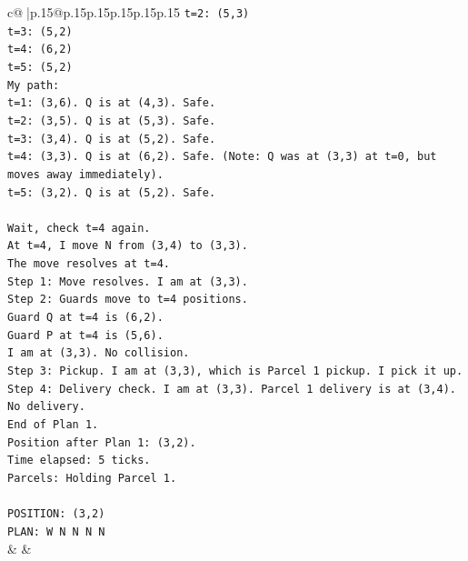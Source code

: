 \documentclass{article}
\begin{document}
{\begin{supertabular}{c@{$\;$}|p{.15\linewidth}@{}p{.15\linewidth}p{.15\linewidth}p{.15\linewidth}p{.15\linewidth}p{.15\linewidth}}
{{{\texttt{t=2: (5,3)} \\
\texttt{t=3: (5,2)} \\
\texttt{t=4: (6,2)} \\
\texttt{t=5: (5,2)} \\
\texttt{My path:} \\
\texttt{t=1: (3,6). Q is at (4,3). Safe.} \\
\texttt{t=2: (3,5). Q is at (5,3). Safe.} \\
\texttt{t=3: (3,4). Q is at (5,2). Safe.} \\
\texttt{t=4: (3,3). Q is at (6,2). Safe. (Note: Q was at (3,3) at t=0, but moves away immediately).} \\
\texttt{t=5: (3,2). Q is at (5,2). Safe.} \\
\\ 
\texttt{Wait, check t=4 again.} \\
\texttt{At t=4, I move N from (3,4) to (3,3).} \\
\texttt{The move resolves at t=4.} \\
\texttt{Step 1: Move resolves. I am at (3,3).} \\
\texttt{Step 2: Guards move to t=4 positions.} \\
\texttt{Guard Q at t=4 is (6,2).} \\
\texttt{Guard P at t=4 is (5,6).} \\
\texttt{I am at (3,3). No collision.} \\
\texttt{Step 3: Pickup. I am at (3,3), which is Parcel 1 pickup. I pick it up.} \\
\texttt{Step 4: Delivery check. I am at (3,3). Parcel 1 delivery is at (3,4). No delivery.} \\
\texttt{End of Plan 1.} \\
\texttt{Position after Plan 1: (3,2).} \\
\texttt{Time elapsed: 5 ticks.} \\
\texttt{Parcels: Holding Parcel 1.} \\
\\ 
\texttt{POSITION: (3,2)} \\
\texttt{PLAN: W N N N N} \\
            }
        }
    }
    & & \\ \\


\end{supertabular}}
\end{document}
